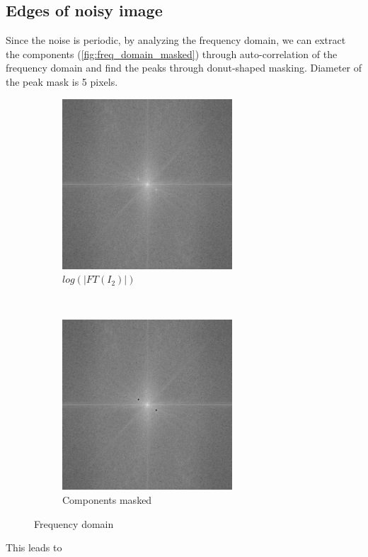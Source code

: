 \documentclass[12pt]{article}
\begin{document}
\subsection*{Edges of noisy image}
Since the noise is periodic, by analyzing the frequency domain, we can extract the components (\autoref{fig:freq_domain_masked}) through auto-correlation of the frequency domain and find the peaks through donut-shaped masking. Diameter of the peak mask is 5 pixels.
\begin{figure}[H]
    \centering
    \begin{subfigure}[t]{0.5\textwidth}
        \centering
        \includegraphics[height=2.5in]{images/log_abs_I2}
        \caption{$log(\vert FT(I_2) \vert)$}
    \end{subfigure}%
    ~
    \begin{subfigure}[t]{0.5\textwidth}
        \centering
        \includegraphics[height=2.5in]{images/mask_X}
        \caption{Components masked}
        \label{fig:freq_domain_masked}
    \end{subfigure}
    \caption{Frequency domain}
\end{figure}
\noindent
This leads to
\end{document}
